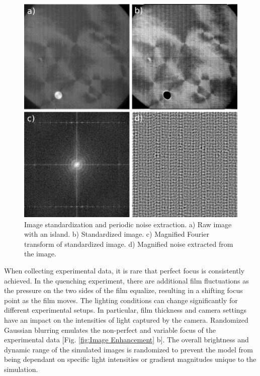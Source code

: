 \documentclass[prl,reprint,showpacs,floatfix,nofootinbib]{revtex4-1}
\begin{document}
\begin{figure}
  \includegraphics[width=\linewidth]{noiseExtraction.png}
  \caption{Image standardization and periodic noise extraction. a) Raw image with an island. b) Standardized image. c) Magnified Fourier transform of standardized image. d) Magnified noise extracted from the image.}
  \label{fig:Standardization and Noise}
\end{figure}

When collecting experimental data, it is rare that perfect focus is consistently achieved. In the quenching experiment, there are additional film fluctuations as the pressure on the two sides of the film equalize, resulting in a shifting focus point as the film moves. The lighting conditions can change significantly for different experimental setups. In particular, film thickness and camera settings have an impact on the intensities of light captured by the camera. Randomized Gaussian blurring emulates the non-perfect and variable focus of the experimental data [Fig. \ref{fig:Image Enhancement} b]. The overall brightness and dynamic range of the simulated images is randomized to prevent the model from being dependant on specific light intensities or gradient magnitudes unique to the simulation.
\end{document}
